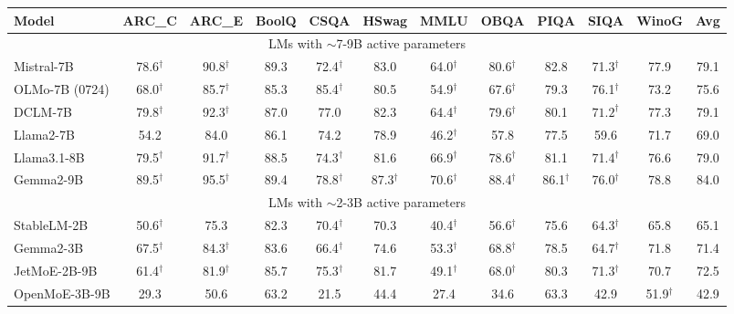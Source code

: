\documentclass{article}
\begin{document}
\begin{table}
\setlength\tabcolsep{2pt} 
\centering
\begin{tabular}{l|ccccccccccc}
\toprule
\footnotesize{\bf{Model}} & \footnotesize{\bf{ARC\_C}} & \footnotesize{\bf{ARC\_E}} & \footnotesize{\bf{BoolQ}} & \footnotesize{\bf{CSQA}} & \footnotesize{\bf{HSwag}} & \footnotesize{\bf{MMLU}} & \footnotesize{\bf{OBQA}} & \footnotesize{\bf{PIQA}} & \footnotesize{\bf{SIQA}} & \footnotesize{\bf{WinoG}} & \footnotesize{\bf{Avg}}\\
\midrule
\multicolumn{12}{c}{LMs with $\sim$7-9B active parameters} \\
\midrule    
Mistral-7B & 78.6$^\dagger$ & 90.8$^\dagger$ & 89.3 & 72.4$^\dagger$ & 83.0 & 64.0$^\dagger$ & 80.6$^\dagger$ & 82.8 & 71.3$^\dagger$ & 77.9 & 79.1 \\
OLMo-7B (0724) & 68.0$^\dagger$ & 85.7$^\dagger$ & 85.3 & 85.4$^\dagger$ & 80.5 & 54.9$^\dagger$ & 67.6$^\dagger$ & 79.3 & 76.1$^\dagger$ & 73.2 & 75.6 \\
DCLM-7B & 79.8$^\dagger$ & 92.3$^\dagger$ & 87.0 & 77.0 & 82.3 & 64.4$^\dagger$ & 79.6$^\dagger$ & 80.1 & $71.2^\dagger$ & 77.3 & 79.1 \\
Llama2-7B & 54.2 & 84.0 & 86.1 & 74.2 & 78.9 & 46.2$^\dagger$ & 57.8 & 77.5 & 59.6 & 71.7 & 69.0 \\
Llama3.1-8B & 79.5$^\dagger$ & 91.7$^\dagger$ & 88.5 & 74.3$^\dagger$ & 81.6 & 66.9$^\dagger$ & 78.6$^\dagger$ & 81.1 & 71.4$^\dagger$ & 76.6 & 79.0\\
Gemma2-9B & 89.5$^\dagger$ & 95.5$^\dagger$ & 89.4 & 78.8$^\dagger$ & 87.3$^\dagger$ & 70.6$^\dagger$ & 88.4$^\dagger$ & 86.1$^\dagger$ & 76.0$^\dagger$ & 78.8 & 84.0 \\
\midrule
\multicolumn{12}{c}{LMs with $\sim$2-3B active parameters} \\
\midrule
StableLM-2B & 50.6$^\dagger$ & 75.3 & 82.3 & 70.4$^\dagger$ & 70.3 & 40.4$^\dagger$ & 56.6$^\dagger$ & 75.6 & 64.3$^\dagger$ & 65.8 & 65.1 \\
Gemma2-3B & 67.5$^\dagger$ & 84.3$^\dagger$ & 83.6 & 66.4$^\dagger$ & 74.6 & 53.3$^\dagger$ & 68.8$^\dagger$ & 78.5 & 64.7$^\dagger$ & 71.8 & 71.4\\
JetMoE-2B-9B & 61.4$^\dagger$ & 81.9$^\dagger$ & 85.7 & 75.3$^\dagger$ & 81.7 & 49.1$^\dagger$ & 68.0$^\dagger$ & 80.3 & 71.3$^\dagger$ & 70.7 & 72.5 \\
OpenMoE-3B-9B & 29.3 & 50.6 & 63.2 & 21.5 & 44.4 & 27.4 & 34.6 & 63.3 & 42.9 & 51.9$^\dagger$ & 42.9 \\

\end{tabular}
\end{table}
\end{document}
